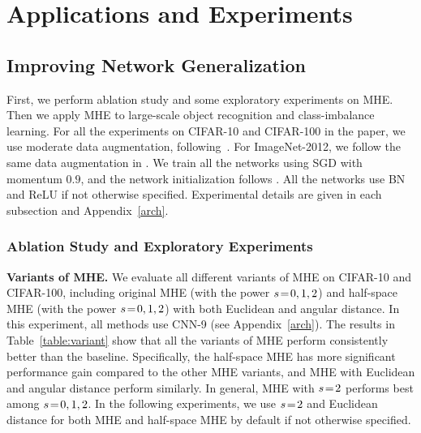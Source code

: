 \section{Applications and Experiments}\label{exp}

\subsection{Improving Network Generalization}

First, we perform ablation study and some exploratory experiments on MHE. Then we apply MHE to large-scale object recognition and class-imbalance learning. For all the experiments on CIFAR-10 and CIFAR-100 in the paper, we use moderate data augmentation, following~\cite{he2015deep,liu2018decoupled}. For ImageNet-2012, we follow the same data augmentation in \cite{liu2017hyper}. We train all the networks using SGD with momentum $0.9$, and the network initialization follows \cite{he2015delving}. All the networks use BN~\cite{ioffe2015batch} and ReLU if not otherwise specified. Experimental details are given in each subsection and Appendix~\ref{arch}.

\subsubsection{Ablation Study and Exploratory Experiments}

\textbf{Variants of MHE.} We evaluate all different variants of MHE on CIFAR-10 and CIFAR-100, including  original MHE (with the power $\thickmuskip=2mu \medmuskip=2mu s=0,1,2$) and half-space MHE (with the power $\thickmuskip=2mu \medmuskip=2mu s=0,1,2$) with both Euclidean and angular distance. In this experiment, all methods use CNN-9 (see Appendix~\ref{arch}). The results in Table~\ref{table:variant} show that all the variants of MHE perform consistently better than the baseline. Specifically, the half-space MHE has more significant performance gain compared to the other MHE variants, and MHE with Euclidean and angular distance perform similarly. In general, MHE with $\thickmuskip=2mu \medmuskip=2mu s=2$ performs best among $\thickmuskip=2mu \medmuskip=2mu s=0,1,2$. In the following experiments, we use $\thickmuskip=2mu \medmuskip=2mu s=2$ and Euclidean distance for both MHE and half-space MHE by default if not otherwise specified.
\par


